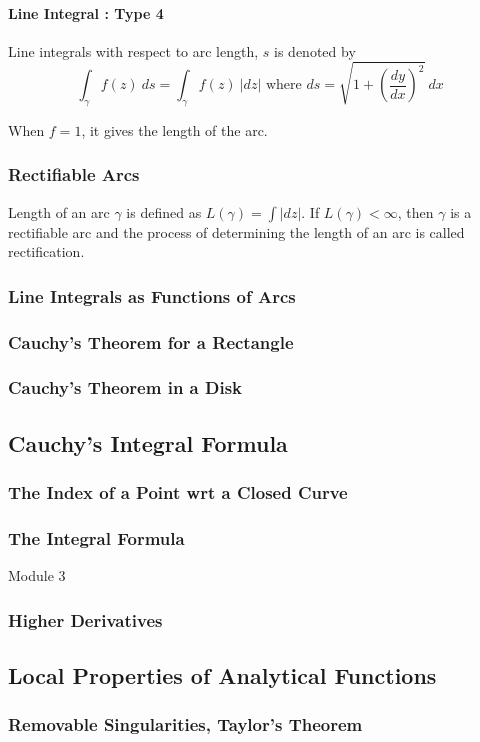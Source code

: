\paragraph{Line Integral : Type 4}
 Line integrals with respect to arc length, $s$ is denoted by 
 \[ \int_\gamma f(z)\ ds  = \int_\gamma f(z)\ |dz| \text{ where } ds = \sqrt{1+\left(\frac{dy}{dx}\right)^2}\ dx \]
 
 	When $f = 1$, it gives the length of the arc.
\subsubsection{Rectifiable Arcs}
	Length of an arc $\gamma$ is defined as $L(\gamma) = \int |dz|$.
	If $L(\gamma) < \infty$, then $\gamma$ is a rectifiable arc and the process of determining the length of an arc is called rectification.

\subsubsection{Line Integrals as Functions of Arcs}
\subsubsection{Cauchy's Theorem for a Rectangle}
\subsubsection{Cauchy's Theorem in a Disk}
\subsection{Cauchy's Integral Formula}
\subsubsection{The Index of a Point wrt a Closed Curve}
\subsubsection{The Integral Formula}
{\Large Module 3 }
\subsubsection{Higher Derivatives}
\subsection{Local Properties of Analytical Functions}
\subsubsection{Removable Singularities, Taylor's Theorem}
